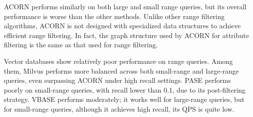 \documentclass[sigconf, nonacm]{acmart}
\begin{document}
{	%
	ACORN performs similarly on both large and small range queries, but its overall performance is worse than the other methods. Unlike other range filtering algorithms, ACORN is not designed with specialized data structures  to achieve efficient range filtering. In fact, the graph structure used by ACORN for attribute filtering is the same as that used for range filtering.
	
	
	Vector databases  show relatively poor performance on range queries. Among them, Milvus performs more balanced across both small-range and large-range queries, even surpassing ACORN under high recall settings. PASE performs poorly on small-range queries, with recall lower than 0.1, due to its post-filtering strategy. 
	VBASE performs moderately; it works well for large-range queries, but for small-range queries, although it achieves high recall, its QPS is quite  low.
	
	
	
	
	
	
	
}
\end{document}
